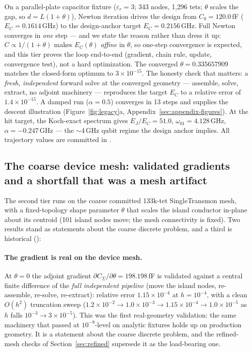 \documentclass{anvil-paper}
\begin{document}
On a parallel-plate capacitor fixture ($\varepsilon_r = 3$; 343 nodes,
1{,}296 tets; $\theta$ scales the gap, so $d = L(1+\theta)$), Newton
iteration drives the design from $C_0 = 120.0$\,fF ($E_C =
0.1614$\,GHz) to the design-anchor target $E_C = 0.2156$\,GHz. Full
Newton converges in \emph{one} step --- and we state the reason rather
than dress it up: $C \propto 1/(1+\theta)$ makes $E_C(\theta)$
\emph{affine} in $\theta$, so one-step convergence is expected, and this
tier proves the loop end-to-end (gradient, chain rule, update,
convergence test), not a hard optimization. The converged $\theta =
0.335657909$ matches the closed-form optimum to $3\times10^{-15}$. The
honesty check that matters: a \emph{fresh, independent} forward solve at
the converged geometry --- assemble, solve, extract, no adjoint machinery
--- reproduces the target $E_C$ to a relative error of
$1.4\times10^{-15}$. A damped run ($\alpha = 0.5$) converges in 13 steps
and supplies the descent illustration
(Figure~\ref{fig:legacy}a, Appendix~\ref{sec:appendix-figures}). At the hit target, the Koch-exact spectrum
gives $E_J/E_C = 51.0$, $\omega_{01} = 4.128$\,GHz, $\alpha =
-0.247$\,GHz --- the ${\sim}4$\,GHz qubit regime the design anchor
implies. All trajectory values are committed in
.

\subsection{The coarse device mesh: validated gradients and a shortfall that was a mesh artifact}
\label{sec:optdemo-pad}

The second tier runs on the coarse committed 133k-tet SingleTransmon
mesh, with a fixed-topology shape parameter $\theta$ that scales the
island conductor in-plane about its centroid (101 island nodes move;
the mesh connectivity is fixed). Two results stand as statements about
the coarse discrete problem, and a third is historical
():

\paragraph{The gradient is real on the device mesh.} At $\theta = 0$ the
adjoint gradient $\partial C_\Sigma/\partial\theta = 198.198$\,fF is
validated against a central finite difference of the \emph{full
independent pipeline} (move the island nodes, re-assemble, re-solve,
re-extract): relative error $1.15\times10^{-4}$ at $h = 10^{-4}$, with a
clean $O(h^2)$ truncation sweep ($1.2\times10^{-2} \to 1.0\times10^{-3}
\to 1.15\times10^{-4} \to 1.0\times10^{-5}$ as $h$ falls
$10^{-3} \to 3\times10^{-5}$). This was the first real-geometry
validation: the same machinery that passed at $10^{-9}$-level on
analytic fixtures holds up on production geometry. It is a statement
about the coarse discrete problem, and the refined-mesh checks of
Section~\ref{sec:refined} supersede it as the load-bearing one.
\end{document}
